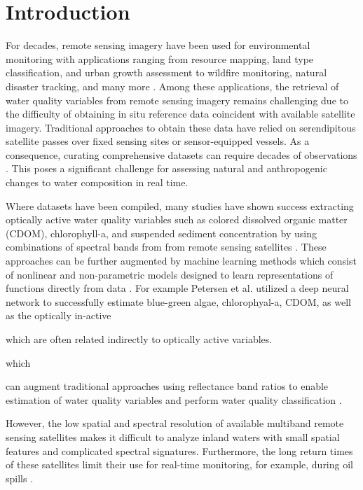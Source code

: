 \documentclass[remotesensing,article,submit,pdftex,moreauthors]{Definitions/mdpi}
\begin{document}
\section{Introduction}

For decades, remote sensing imagery have been used for environmental monitoring with applications ranging from resource mapping, land type classification, and urban growth assessment to wildfire monitoring, natural disaster tracking, and many more \cite{melesse2007remote, joyce2009review}. Among these applications, the retrieval of water quality variables from remote sensing imagery remains challenging due to the difficulty of obtaining in situ reference data coincident with available satellite imagery. Traditional approaches to obtain these data have relied on serendipitous satellite passes over fixed sensing sites or sensor-equipped vessels. As a consequence, curating comprehensive datasets can require decades of observations \cite{aurin2018remote, ross2019aquasat}. This poses a significant challenge for assessing natural and anthropogenic changes to water composition in real time.

Where datasets have been compiled, many studies have shown success extracting optically active water quality variables such as colored dissolved organic matter (CDOM), chlorophyll-a, and suspended sediment concentration by using combinations of spectral bands from from remote sensing satellites \cite{remote-sensing-finland,bonansea2015using}. These approaches can be further augmented by machine learning methods which consist of nonlinear and non-parametric models designed to learn representations of functions directly from data \cite{sagan2020monitoring}. For example Petersen et al. utilized a deep neural network to successfully estimate blue-green algae, chlorophyal-a, CDOM, as well as the optically in-active

which are often related indirectly to optically active variables.

which  \cite{sagan2020monitoring, peterson2020deep}

can augment traditional approaches using reflectance band ratios to enable estimation of water quality variables and perform water quality classification \cite{schiller1999neural, brown2008neural, lary2010artificial, feng2015urban,belgiu2016random}. 

However, the low spatial and spectral resolution of available multiband remote sensing satellites makes it difficult to analyze inland waters with small spatial features and complicated spectral signatures. Furthermore, the long return times of these satellites limit their use for real-time monitoring, for example, during oil spills \cite{fingas2017review}.
\end{document}
